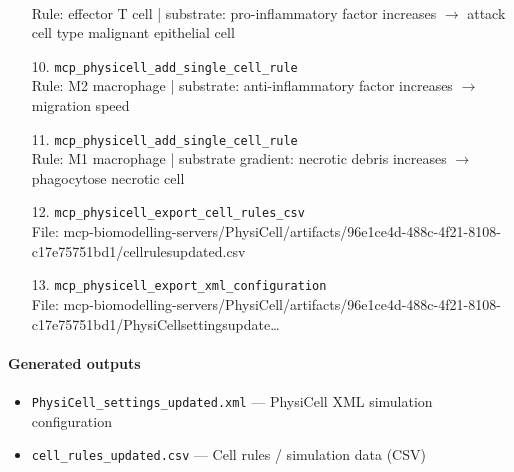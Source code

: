 \begin{enumerate}
\hfill\\
\RaggedRight Rule: effector T cell | substrate: pro-inflammatory factor increases \ensuremath{\rightarrow} attack cell type malignant epithelial cell
\item[10.] \texttt{mcp\_\allowbreak{}physicell\_\allowbreak{}add\_\allowbreak{}single\_\allowbreak{}cell\_\allowbreak{}rule}
\hfill\\
\RaggedRight Rule: M2 macrophage | substrate: anti-inflammatory factor increases \ensuremath{\rightarrow} migration speed
\item[11.] \texttt{mcp\_\allowbreak{}physicell\_\allowbreak{}add\_\allowbreak{}single\_\allowbreak{}cell\_\allowbreak{}rule}
\hfill\\
\RaggedRight Rule: M1 macrophage | substrate gradient: necrotic debris increases \ensuremath{\rightarrow} phagocytose necrotic cell
\item[12.] \texttt{mcp\_\allowbreak{}physicell\_\allowbreak{}export\_\allowbreak{}cell\_\allowbreak{}rules\_\allowbreak{}csv}
\hfill\\
\RaggedRight File: mcp-biomodelling-servers/PhysiCell/artifacts/96e1ce4d-488c-4f21-8108-c17e75751bd1/cellrulesupdated.csv
\item[13.] \texttt{mcp\_\allowbreak{}physicell\_\allowbreak{}export\_\allowbreak{}xml\_\allowbreak{}configuration}
\hfill\\
\RaggedRight File: mcp-biomodelling-servers/PhysiCell/artifacts/96e1ce4d-488c-4f21-8108-c17e75751bd1/PhysiCellsettingsupdate\ldots{}
\end{enumerate}
\endgroup

\paragraph{Generated outputs}
\begin{itemize}
\item \texttt{PhysiCell\_\allowbreak{}settings\_\allowbreak{}updated.\allowbreak{}xml} — PhysiCell XML simulation configuration
\item \texttt{cell\_\allowbreak{}rules\_\allowbreak{}updated.\allowbreak{}csv} — Cell rules / simulation data (CSV)
\end{itemize}
